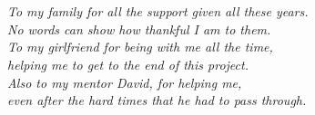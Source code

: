 
\chapter*{}
\thispagestyle{empty}

\begin{flushright}
  \textit{
    To my family for all the support given all these years.\\
    No words can show how thankful I am to them. \\ [0.5 cm]
    To my girlfriend for being with me all the time, \\
    helping me to get to the end of this project. \\ [0.5 cm]
    Also to my mentor David, for helping me,\\
    even after the hard times that he had to pass through.
  }
\end{flushright}
